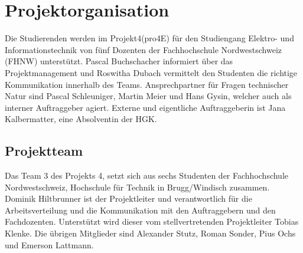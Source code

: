 \documentclass[10pt,a4paper,oneside]{99_fhnwreport}
\begin{document}
\section{Projektorganisation}\label{sec:projektorganisation}

Die Studierenden werden im Projekt4(pro4E) für den Studiengang Elektro- und Informationstechnik von fünf Dozenten der Fachhochschule Nordwestschweiz (FHNW) unterstützt. Pascal Buchschacher informiert über das Projektmanagement und Roswitha Dubach vermittelt den Studenten die richtige Kommunikation innerhalb des Teams. Ansprechpartner für Fragen technischer Natur sind Pascal Schleuniger, Martin Meier und Hans Gysin, welcher auch als interner Auftraggeber agiert.
Externe und eigentliche Auftraggeberin ist Jana Kalbermatter, eine Absolventin der HGK.

\subsection{Projektteam}\label{subsec:projektteam}

Das Team 3 des Projekts 4, setzt sich aus sechs Studenten der Fachhochschule Nordwestschweiz, Hochschule für Technik in Brugg/Windisch zusammen. Dominik Hiltbrunner ist der Projektleiter und verantwortlich für die Arbeitsverteilung und die Kommunikation mit den Auftraggebern und den Fachdozenten. Unterstützt wird dieser vom stellvertretenden Projektleiter Tobias Klenke. Die übrigen Mitglieder sind Alexander Stutz, Roman Sonder, Pius Ochs und Emerson Lattmann.
\newpage
\end{document}
